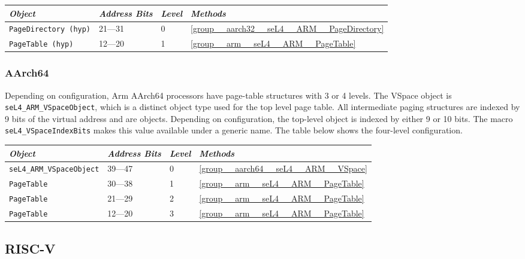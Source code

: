 \begin{tabularx}{\textwidth}{Xlll} \toprule
  \emph{Object}          & \emph{Address Bits} & \emph{Level} & \emph{Methods} \\ \midrule
  \texttt{PageDirectory (hyp)} & 21---31     & 0            & \autoref{group__aarch32__seL4__ARM__PageDirectory} \\
  \texttt{PageTable (hyp)}     & 12---20     & 1            & \autoref{group__arm__seL4__ARM__PageTable} \\
  \bottomrule
\end{tabularx}

\subsubsection{AArch64}

Depending on configuration, Arm AArch64 processors have page-table structures with 3 or 4 levels.
The VSpace object is \texttt{seL4\_ARM\_VSpaceObject}, which is a distinct object type used for the
top level page table. All intermediate paging structures are indexed by 9 bits of the virtual
address and are  objects. Depending on configuration, the top-level object is
indexed by either 9 or 10 bits. The macro \texttt{seL4\_VSpaceIndexBits} makes this value available
under a generic name. The table below shows the four-level configuration.

\begin{tabularx}{\textwidth}{Xlll} \toprule
\emph{Object}                    & \emph{Address Bits} & \emph{Level} & \emph{Methods} \\ \midrule
    \texttt{seL4\_ARM\_VSpaceObject}
                                 & 39---47             & 0            & \autoref{group__aarch64__seL4__ARM__VSpace} \\
    \texttt{PageTable}           & 30---38             & 1            & \autoref{group__arm__seL4__ARM__PageTable} \\
    \texttt{PageTable}           & 21---29             & 2            & \autoref{group__arm__seL4__ARM__PageTable} \\
    \texttt{PageTable}           & 12---20             & 3            & \autoref{group__arm__seL4__ARM__PageTable} \\
\bottomrule
\end{tabularx}

\subsection{RISC-V}

